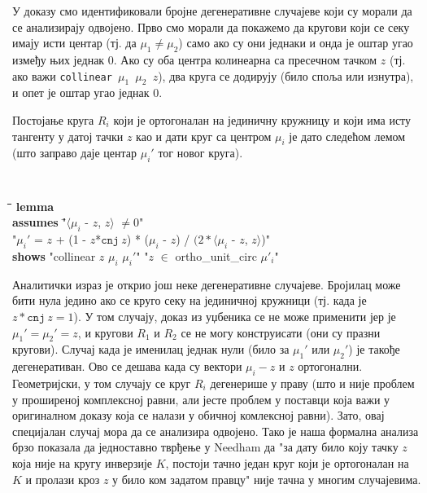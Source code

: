 У доказу смо идентификовали бројне дегенеративне случајеве који су
морали да се анализирају одвојено. Прво смо морали да покажемо да
кругови који се секу имају исти центар (тј. да $\mu_1$$\neq$$\mu_2$)
само ако су они једнаки и онда је оштар угао између њих једнак
$0$. Ако су оба центра колинеарна са пресечном тачком $z$ (тј. ако
важи {\tt collinear $\mu_1$ $\mu_2$ $z$}), два круга се додирују (било
споља или изнутра), и опет је оштар угао једнак $0$.

Постојање круга $R_i$ који је ортогоналан на јединичну кружницу и који
има исту тангенту у датој тачки $z$ као и дати круг са центром $\mu_i$
је дато следећом лемом (што заправо даје центар $\mu_i'$ тог новог
круга).
{\tt
  \begin{tabbing}
    \hspace{5mm}\=\hspace{5mm}\=\hspace{5mm}\=\hspace{5mm}\=\hspace{5mm}\=\kill
{\bf lemma} \\
\> {\bf assumes} \="$\langle$$\mu_i$ - $z$, $z$$\rangle$ $\neq 0$"\\
\>\> "$\mu_i'$ = $z$ + (1 - $z$*$\mathtt{cnj}\ z$) * ($\mu_i$ - $z$) / $(2 * \langle$$\mu_i$ - $z$, $z$$\rangle$)"\\
  \> {\bf shows} "collinear $z$ $\mu_i$ $\mu_i'$" "$z$ $\in$ ortho\_unit\_circ $\mu'_i$" \\
  \end{tabbing}
}
\noindent Аналитички израз је открио још неке дегенеративне
случајеве. Бројилац може бити нула једино ако се круго секу на
јединичној кружници (тј. када је $z*\mathtt{cnj}\ z = 1$). У том
случају, доказ из уџбеника се не може применити јер је $\mu_1' =
\mu_2' = z$, и кругови $R_1$ и $R_2$ се не могу конструисати (они су
празни кругови). Случај када је именилац једнак нули (било за $\mu_1'$
или $\mu_2'$) је такође дегенеративан. Ово се дешава када су вектори
$\mu_i - z$ и $z$ ортогонални. Геометријски, у том случају се круг
$R_i$ дегенерише у праву (што и није проблем у проширеној комплексној
равни, али јесте проблем у поставци која важи у оригиналном доказу
која се налази у обичној комлексној равни). Зато, овај специјалан
случај мора да се анализира одвојено. Тако је наша формална анализа
брзо показала да једноставно тврђење у Needham да "за дату било коју
тачку $z$ која није на кругу инверзије $K$, постоји тачно један круг
који је ортогоналан на $K$ и пролази кроз $z$ у било ком задатом
правцу" није тачна у многим случајевима.



